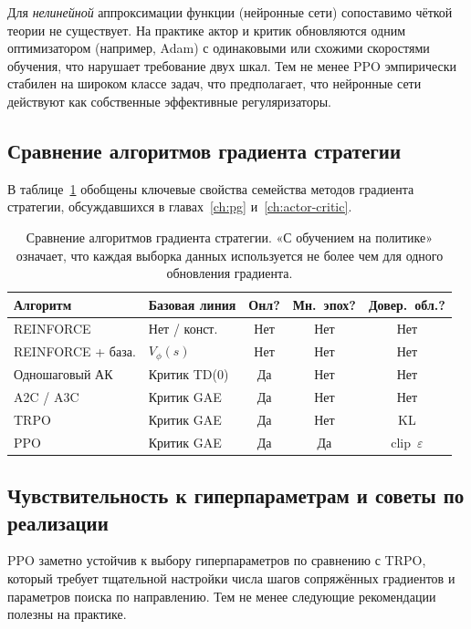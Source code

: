 Для \emph{нелинейной} аппроксимации функции (нейронные сети) сопоставимо чёткой теории не существует. На практике актор и критик обновляются одним оптимизатором (например, Adam) с одинаковыми или схожими скоростями обучения, что нарушает требование двух шкал. Тем не менее PPO эмпирически стабилен на широком классе задач, что предполагает, что нейронные сети действуют как собственные эффективные регуляризаторы.

\subsection{Сравнение алгоритмов градиента стратегии}

В таблице~\ref{tab:pg-comparison} обобщены ключевые свойства семейства методов градиента стратегии, обсуждавшихся в главах~\ref{ch:pg} и~\ref{ch:actor-critic}.

\begin{table}[ht]
\centering
\caption{Сравнение алгоритмов градиента стратегии. «С обучением на политике» означает, что каждая выборка данных используется не более чем для одного обновления градиента.}
\label{tab:pg-comparison}
\footnotesize
\begin{tabular}{@{}lp{2.2cm}ccc@{}}
\toprule
Алгоритм & Базовая линия & Онл? & Мн.\ эпох? & Довер.\ обл.? \\
\midrule
REINFORCE               & Нет / конст.  & Нет  & Нет  & Нет  \\
REINFORCE + база.      & $V_\phi(s)$      & Нет  & Нет  & Нет  \\
Одношаговый АК          & Критик TD(0)     & Да & Нет  & Нет  \\
A2C / A3C               & Критик GAE       & Да & Нет  & Нет  \\
TRPO                    & Критик GAE       & Да & Нет & KL \\
PPO                     & Критик GAE       & Да & Да & clip~$\varepsilon$ \\
\bottomrule
\end{tabular}
\end{table}

\subsection{Чувствительность к гиперпараметрам и советы по реализации}

PPO заметно устойчив к выбору гиперпараметров по сравнению с TRPO, который требует тщательной настройки числа шагов сопряжённых градиентов и параметров поиска по направлению. Тем не менее следующие рекомендации полезны на практике.

